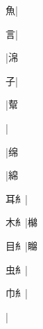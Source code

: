 \begin{multicols}{2}
{{\cjk{}{\cnsym{}　}{\cnsym{}　}魚}|{}\par
{\cjk{}{\cnsym{}　}{\cnsym{}　}言}|{}\par
{}|{\cjk{}淿}\par
{子}|{}\par
{}|{\cjk{}幚}\par
{}|{}\par
{}|{\cjk{}绵}\par
{}|{\cjk{}綿}\par
{\cjk{}{\cnsym{}　}耳{糹}}|{}\par
{\cjk{}{\cnsym{}　}木{糹}}|{\cjk{}檰}\par
{\cjk{}{\cnsym{}　}目{糹}}|{\cjk{}矊}\par
{\cjk{}{\cnsym{}　}虫{糹}}|{}\par
{\cjk{}{\cnsym{}　}巾{糹}}|{}\par
{}|{}\par
}
\end{multicols}
